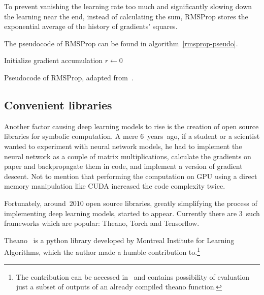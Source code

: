 To prevent vanishing the learning rate too much and significantly slowing down the learning near the end, instead of calculating the sum, RMSProp stores the exponential average of the history of gradients' squares.

The pseudocode of RMSProp can be found in algorithm~\ref{rmsprop-pseudo}.
\begin{algorithm}
  \DontPrintSemicolon
  Initialize gradient accumulation $r \leftarrow 0$\;
  \caption{Pseudocode of RMSProp, adapted from~\cite{dlbook}.}\label{rmsprop-pseudo}
\end{algorithm}

\subsection{Convenient libraries}
Another factor causing deep learning models to rise is the creation of open source libraries for symbolic computation. A mere $6$~years~ago, if a student or a scientist wanted to experiment with neural network models, he had to implement the neural network as a couple of matrix multiplications, calculate the gradients on paper and backpropagate them in code, and implement a version of gradient descent. Not to mention that performing the computation on GPU using a direct memory manipulation like CUDA increased the code complexity twice.

Fortunately, around~$2010$ open source libraries, greatly simplifying the process of implementing deep learning models, started to appear. Currently there are $3$~such frameworks which are popular: Theano, Torch and Tensorflow.

Theano~\cite{theano} is a python library developed by Montreal Institute for Learning Algorithms, which the author made a humble contribution to.\footnote{The contribution can be accessed in~\cite{theano-contrib} and contains possibility of evaluation just a subset of outputs of an already compiled theano function.}

